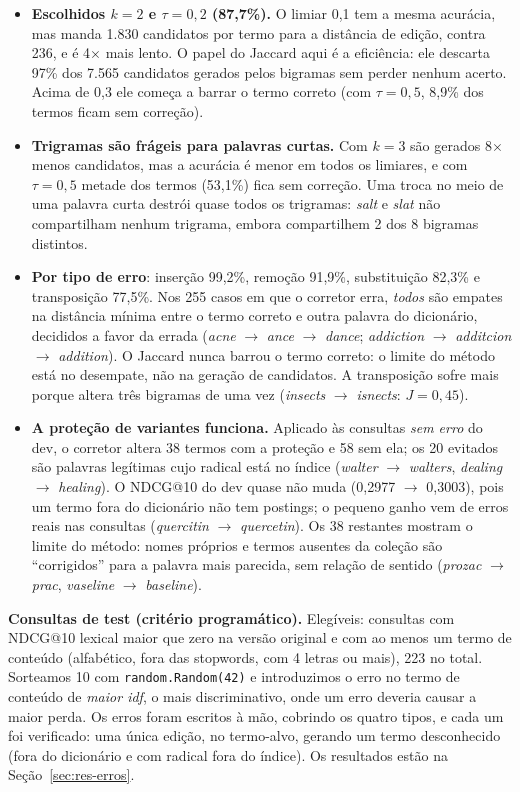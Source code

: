 \documentclass[10pt,a4paper]{article}
\begin{document}
\begin{itemize}
\item \textbf{Escolhidos $k = 2$ e $\tau = 0{,}2$ (87,7\%).} O limiar 0,1 tem a mesma acurácia, mas manda 1.830 candidatos por termo para a distância de edição, contra 236, e é 4$\times$ mais lento. O papel do Jaccard aqui é a eficiência: ele descarta 97\% dos 7.565 candidatos gerados pelos bigramas sem perder nenhum acerto. Acima de 0,3 ele começa a barrar o termo correto (com $\tau = 0{,}5$, 8,9\% dos termos ficam sem correção).
\item \textbf{Trigramas são frágeis para palavras curtas.} Com $k = 3$ são gerados 8$\times$ menos candidatos, mas a acurácia é menor em todos os limiares, e com $\tau = 0{,}5$ metade dos termos (53,1\%) fica sem correção. Uma troca no meio de uma palavra curta destrói quase todos os trigramas: \emph{salt} e \emph{slat} não compartilham nenhum trigrama, embora compartilhem 2 dos 8 bigramas distintos.
\item \textbf{Por tipo de erro}: inserção 99,2\%, remoção 91,9\%, substituição 82,3\% e transposição 77,5\%. Nos 255 casos em que o corretor erra, \emph{todos} são empates na distância mínima entre o termo correto e outra palavra do dicionário, decididos a favor da errada (\emph{acne} $\to$ \emph{ance} $\to$ \emph{dance}; \emph{addiction} $\to$ \emph{additcion} $\to$ \emph{addition}). O Jaccard nunca barrou o termo correto: o limite do método está no desempate, não na geração de candidatos. A transposição sofre mais porque altera três bigramas de uma vez (\emph{insects} $\to$ \emph{isnects}: $J = 0{,}45$).
\item \textbf{A proteção de variantes funciona.} Aplicado às consultas \emph{sem erro} do dev, o corretor altera 38 termos com a proteção e 58 sem ela; os 20 evitados são palavras legítimas cujo radical está no índice (\emph{walter} $\to$ \emph{walters}, \emph{dealing} $\to$ \emph{healing}). O NDCG@10 do dev quase não muda (0,2977 $\to$ 0,3003), pois um termo fora do dicionário não tem postings; o pequeno ganho vem de erros reais nas consultas (\emph{quercitin} $\to$ \emph{quercetin}). Os 38 restantes mostram o limite do método: nomes próprios e termos ausentes da coleção são ``corrigidos'' para a palavra mais parecida, sem relação de sentido (\emph{prozac} $\to$ \emph{prac}, \emph{vaseline} $\to$ \emph{baseline}).
\end{itemize}

\textbf{Consultas de test (critério programático).} Elegíveis: consultas com NDCG@10 lexical maior que zero na versão original e com ao menos um termo de conteúdo (alfabético, fora das stopwords, com 4 letras ou mais), 223 no total. Sorteamos 10 com \texttt{random.Random(42)} e introduzimos o erro no termo de conteúdo de \emph{maior idf}, o mais discriminativo, onde um erro deveria causar a maior perda. Os erros foram escritos à mão, cobrindo os quatro tipos, e cada um foi verificado: uma única edição, no termo-alvo, gerando um termo desconhecido (fora do dicionário e com radical fora do índice). Os resultados estão na Seção~\ref{sec:res-erros}.
\end{document}
